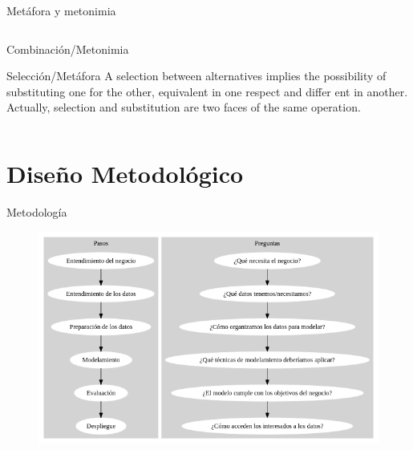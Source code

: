 \documentclass[presentation]{beamer}
\begin{document}
\begin{frame}[label={sec:orgba5e553}]{Metáfora y metonimia}
\begin{columns}
\begin{column}{0.48\columnwidth}
\begin{block}{Combinación/Metonimia}
   \end{block}

   \begin{block}{Selección/Metáfora}
A selection between alternatives implies the possibility
of substituting one for the other, equivalent in one respect and differ­
ent in another. Actually, selection and substitution are two faces of the
same operation.


   \end{block}

\normal
\end{column}
\end{columns}
\end{frame}
\section{Diseño Metodológico}
\label{sec:orge20ea37}
\begin{frame}[label={sec:org4513d13}]{Metodología}
  \begin{figure}
   \includegraphics[width=\textwidth]{./assets/metodologia.png}

\end{figure}
\end{frame}
\end{document}
